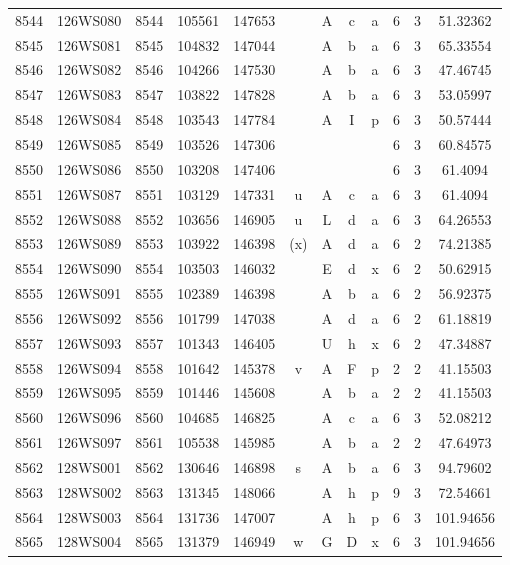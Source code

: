 \begin{tabular}{|*{12}{c|}}
8544 & 126WS080 & 8544 & 105561 & 147653 &  & A & c & a & 6 & 3 & 51.32362 \\ 
8545 & 126WS081 & 8545 & 104832 & 147044 &  & A & b & a & 6 & 3 & 65.33554 \\ 
8546 & 126WS082 & 8546 & 104266 & 147530 &  & A & b & a & 6 & 3 & 47.46745 \\ 
8547 & 126WS083 & 8547 & 103822 & 147828 &  & A & b & a & 6 & 3 & 53.05997 \\ 
8548 & 126WS084 & 8548 & 103543 & 147784 &  & A & I & p & 6 & 3 & 50.57444 \\ 
8549 & 126WS085 & 8549 & 103526 & 147306 &  &  &  &  & 6 & 3 & 60.84575 \\ 
8550 & 126WS086 & 8550 & 103208 & 147406 &  &  &  &  & 6 & 3 & 61.4094 \\ 
8551 & 126WS087 & 8551 & 103129 & 147331 & u & A & c & a & 6 & 3 & 61.4094 \\ 
8552 & 126WS088 & 8552 & 103656 & 146905 & u & L & d & a & 6 & 3 & 64.26553 \\ 
8553 & 126WS089 & 8553 & 103922 & 146398 & (x) & A & d & a & 6 & 2 & 74.21385 \\ 
8554 & 126WS090 & 8554 & 103503 & 146032 &  & E & d & x & 6 & 2 & 50.62915 \\ 
8555 & 126WS091 & 8555 & 102389 & 146398 &  & A & b & a & 6 & 2 & 56.92375 \\ 
8556 & 126WS092 & 8556 & 101799 & 147038 &  & A & d & a & 6 & 2 & 61.18819 \\ 
8557 & 126WS093 & 8557 & 101343 & 146405 &  & U & h & x & 6 & 2 & 47.34887 \\ 
8558 & 126WS094 & 8558 & 101642 & 145378 & v & A & F & p & 2 & 2 & 41.15503 \\ 
8559 & 126WS095 & 8559 & 101446 & 145608 &  & A & b & a & 2 & 2 & 41.15503 \\ 
8560 & 126WS096 & 8560 & 104685 & 146825 &  & A & c & a & 6 & 3 & 52.08212 \\ 
8561 & 126WS097 & 8561 & 105538 & 145985 &  & A & b & a & 2 & 2 & 47.64973 \\ 
8562 & 128WS001 & 8562 & 130646 & 146898 & s & A & b & a & 6 & 3 & 94.79602 \\ 
8563 & 128WS002 & 8563 & 131345 & 148066 &  & A & h & p & 9 & 3 & 72.54661 \\ 
8564 & 128WS003 & 8564 & 131736 & 147007 &  & A & h & p & 6 & 3 & 101.94656 \\ 
8565 & 128WS004 & 8565 & 131379 & 146949 & w & G & D & x & 6 & 3 & 101.94656 \\ 

\end{tabular}
